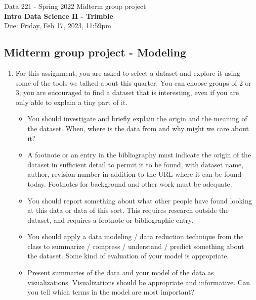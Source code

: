 \documentclass[]{book}
\theoremstyle{definition}
\begin{document}
\begin{center}
{\Large Data 221 - Spring 2022 \hspace{0.5cm} Midterm group project }\\
\textbf{Intro Data Science II - Trimble}\\ %
Due:  Friday, Feb 17, 2023, 11:59pm
\end{center}

\vspace{0.2 cm}

\subsection*{Midterm group project - Modeling }

\begin{enumerate}
\item\label{norms}

For this assignment, you are asked to select a dataset and explore it using some of the tools we talked about this quarter.  You can choose groups of 2 or 3; you are encouraged to find a dataset that is interesting, even if you are only able to explain a tiny part of it.

\begin{itemize}
\item  You should investigate and briefly explain the origin and the meaning of the dataset.  When, where is the data from and why might we care about it?  

\item A footnote or an entry in the bibliography must indicate the origin of the dataset in sufficient detail to permit it to be found, with dataset name, author, revision number in addition to the URL where it can be found today.  Footnotes for background and other work must be adequate. 

\item You should report something about what other people have found looking at this data or data of this sort.  This requires research outside the dataset, and requires a footnote or bibliographic entry.

\item You should apply a data modeling / data reduction technique from the class to summarize / compress / understand / predict something about the dataset.  Some kind of evaluation of your model is appropriate.

\item  Present summaries of the data and your model of the data as visualizations.  Visualizations should be appropriate and informative.  Can you tell which terms in the model are most important?


\end{itemize}
\end{enumerate}
\end{document}
